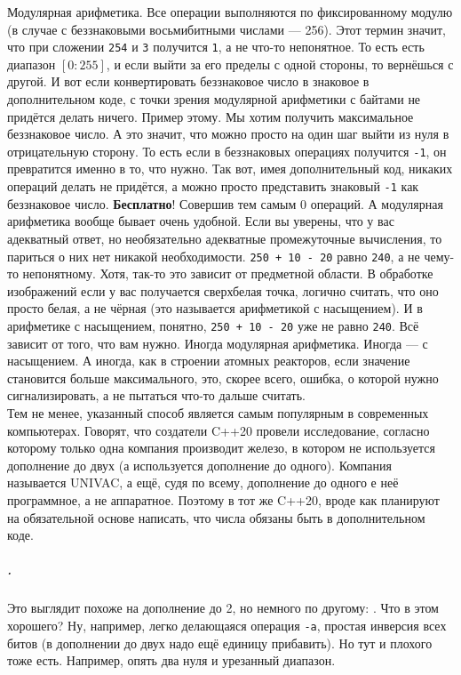 \documentclass{article}
\newcommand{\eval}[1]{\pgfmathparse{#1}\pgfmathresult}
\begin{document}
    Модулярная арифметика. Все операции выполняются по фиксированному модулю (в случае с беззнаковыми восьмибитными числами --- 256). Этот термин значит, что при сложении \texttt{254} и \texttt{3} получится \texttt{1}, а не что-то непонятное. То есть есть диапазон $[0:255]$, и если выйти за его пределы с одной стороны, то вернёшься с другой. И вот если конвертировать беззнаковое число в знаковое в дополнительном коде, с точки зрения модулярной арифметики с байтами не придётся делать ничего. Пример этому. Мы хотим получить максимальное беззнаковое число. А это значит, что можно просто на один шаг выйти из нуля в отрицательную сторону. То есть если в беззнаковых операциях получится \texttt{-1}, он превратится именно в то, что нужно. Так вот, имея дополнительный код, никаких операций делать не придётся, а можно просто представить знаковый  \texttt{-1} как беззнаковое число. \textbf{Бесплатно}! Совершив тем самым 0 операций. А модулярная арифметика вообще бывает очень удобной. Если вы уверены, что у вас адекватный ответ, но необязательно адекватные промежуточные вычисления, то париться о них нет никакой необходимости. \texttt{250 + 10 - 20} равно \texttt{240}, а не чему-то непонятному. Хотя, так-то это зависит от предметной области. В обработке изображений если у вас получается сверхбелая точка, логично считать, что оно просто белая, а не чёрная (это называется арифметикой с насыщением). И в арифметике с насыщением, понятно, \texttt{250 + 10 - 20} уже не равно \texttt{240}. Всё зависит от того, что вам нужно. Иногда модулярная арифметика. Иногда --- с насыщением. А иногда, как в строении атомных реакторов, если значение становится больше максимального, это, скорее всего, ошибка, о которой нужно сигнализировать, а не пытаться что-то дальше считать.\\
    Тем не менее, указанный способ является самым популярным в современных компьютерах. Говорят, что создатели C++20 провели исследование, согласно которому только одна компания производит железо, в котором не используется дополнение до двух (а используется дополнение до одного). Компания называется UNIVAC, а ещё, судя по всему, дополнение до одного е неё программное, а не аппаратное. Поэтому в тот же C++20, вроде как планируют на обязательной основе написать, что числа обязаны быть в дополнительном коде.
    \subparagraph{.}
    Это выглядит похоже на дополнение до 2, но немного по другому: \adjustbox{valign=t}{\begin{tikzpicture}[scale=.45, every node/.style={scale=0.6}]
        \draw[step=1cm,black,very thin] (0,0) grid (8,1);
        \node at (.5,-.25) {$-127$};
        \foreach\i in {1,...,7} {
            \node at (\i+.5,-.25) {\eval{int(2^(7-\i))}};
        }
    \end{tikzpicture}}. Что в этом хорошего? Ну, например, легко делающаяся операция \texttt{-a}, простая инверсия всех битов (в дополнении до двух надо ещё единицу прибавить). Но тут и плохого тоже есть. Например, опять два нуля и урезанный диапазон.\\
\end{document}
